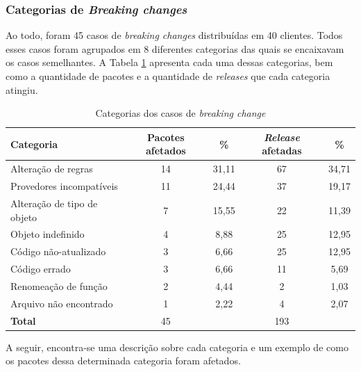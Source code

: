 \subsubsection{Categorias de \textit{Breaking changes}}
Ao todo, foram 45 casos de \textit{breaking changes} distribuídas em 40 clientes. Todos esses casos foram agrupados em 8 diferentes categorias das quais se encaixavam os casos semelhantes. A Tabela \ref{tab:bc_category} apresenta cada uma dessas categorias, bem como a quantidade de pacotes e a quantidade de \textit{releases} que cada categoria atingiu.

\begin{table}[]
\begin{tabular}{|l|c|c|c|c|}
\hline
\centering
\textbf{Categoria}           & \textbf{Pacotes afetados} & \textbf{\%}   & \textbf{\textit{Release} afetadas} & \textbf{\%}    \\ \hline
Alteração de regras          & 14              & 31,11 & 67                          & 34,71 \\
Provedores incompatíveis     & 11              & 24,44 & 37                          & 19,17 \\
Alteração de tipo de objeto  & 7               & 15,55 & 22                          & 11,39 \\
Objeto indefinido            & 4               & 8,88  & 25                          & 12,95 \\
Código não-atualizado        & 3               & 6,66  & 25                          & 12,95 \\
Código errado                & 3               & 6,66  & 11                          & 5,69  \\
Renomeação de função         & 2               & 4,44  & 2                           & 1,03  \\
Arquivo não encontrado       & 1               & 2,22  & 4                           & 2,07  \\ \hline
\textbf{Total}               & 45              &       & 193                         &       \\ \hline
\end{tabular}
\caption{Categorias dos casos de \textit{breaking change}}
\label{tab:bc_category}
\end{table}

A seguir, encontra-se uma descrição sobre cada categoria e um exemplo de como os pacotes dessa determinada categoria foram afetados.


